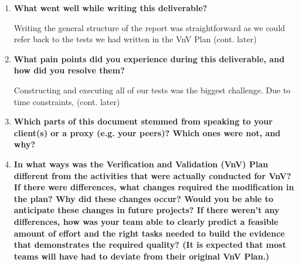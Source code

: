 \documentclass[12pt, titlepage]{article}
\begin{document}
\begin{enumerate}
  \item \textbf{What went well while writing this deliverable?}

  Writing the general structure of the report was straightforward as we could
  refer back to the tests we had written in the VnV Plan (cont. later)

  \item \textbf{What pain points did you experience during this deliverable, and
  how did you resolve them?}

  Constructing and executing all of our tests was the biggest challenge. Due to
  time constraints, (cont. later)

  \item \textbf{Which parts of this document stemmed from speaking to your
  client(s) or a proxy (e.g. your peers)? Which ones were not, and why?}

  \item \textbf{In what ways was the Verification and Validation (VnV) Plan
  different from the activities that were actually conducted for VnV?  If there
  were differences, what changes required the modification in the plan?  Why did
  these changes occur?  Would you be able to anticipate these changes in future
  projects?  If there weren't any differences, how was your team able to clearly
  predict a feasible amount of effort and the right tasks needed to build the
  evidence that demonstrates the required quality?  (It is expected that most
  teams will have had to deviate from their original VnV Plan.)}
\end{enumerate}
\end{document}
